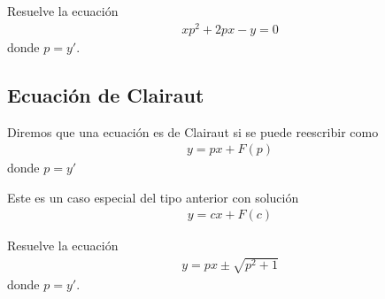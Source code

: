 {}
  \begin{problema}
   Resuelve la ecuación 
   \begin{align*}
    xp^{2}+2px-y =0
    \end{align*}
    donde $p=y'$.
  \end{problema}


\subsection{Ecuación de Clairaut}
{}
  Diremos que una ecuación es de Clairaut si se puede reescribir como 
  \begin{align*}
   y = px+F(p)
   \end{align*}
   donde $p = y'$

{}
  Este es un caso especial del tipo anterior con solución 
  \begin{align*}
   y = cx + F(c)
   \end{align*}

{}
  \begin{problema}
   Resuelve la ecuación
   \begin{align*}
    y = px\pm \sqrt{p^{2}+1}
    \end{align*}
    donde $p=y'$.
  \end{problema}


% 
% 
% 
%   
% 
